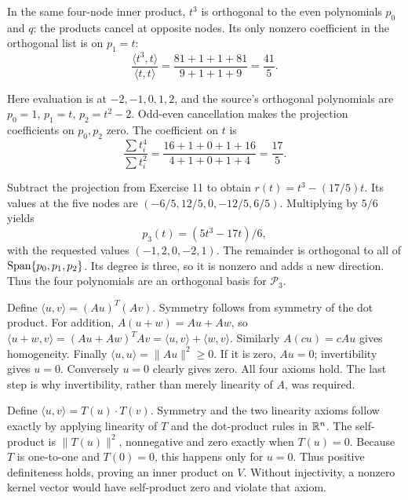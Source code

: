 In the same four-node inner product, $t^3$ is orthogonal to the
even polynomials $p_0$ and $q$: the products cancel at opposite nodes.
Its only nonzero coefficient in the orthogonal list is on $p_1=t$:
\[
 \frac{\langle t^3,t\rangle}{\langle t,t\rangle}
 =\frac{81+1+1+81}{9+1+1+9}=\frac{41}{5}.
\]

Here evaluation is at $-2,-1,0,1,2$, and the source's orthogonal
polynomials are $p_0=1$, $p_1=t$, $p_2=t^2-2$.
Odd-even cancellation makes the projection coefficients on $p_0,p_2$
zero. The coefficient on $t$ is
\[
 \frac{\sum t_i^4}{\sum t_i^2}
 =\frac{16+1+0+1+16}{4+1+0+1+4}=\frac{17}{5}.
\]

Subtract the projection from Exercise 11 to obtain
$r(t)=t^3-(17/5)t$. Its values at the five nodes are
$(-6/5,12/5,0,-12/5,6/5)$.
Multiplying by $5/6$ yields
\[
 \boxed{p_3(t)=(5t^3-17t)/6},
\]
with the requested values $(-1,2,0,-2,1)$. The remainder is
orthogonal to all of $\operatorname{Span}\{p_0,p_1,p_2\}$. Its degree is three,
so it is nonzero and adds a new direction. Thus the four polynomials
are an orthogonal basis for $\mathcal P_3$.

Define $\langle u,v\rangle=(Au)^T(Av)$.
Symmetry follows from symmetry of the dot product. For addition,
$A(u+w)=Au+Aw$, so
$\langle u+w,v\rangle=(Au+Aw)^TAv=\langle u,v\rangle+\langle w,v\rangle$.
Similarly $A(cu)=cAu$ gives homogeneity.
Finally $\langle u,u\rangle=\|Au\|^2\ge0$.
If it is zero, $Au=0$; invertibility gives $u=0$.
Conversely $u=0$ clearly gives zero. All four axioms hold.
The last step is why invertibility, rather than merely linearity of $A$,
was required.

Define $\langle u,v\rangle=T(u)\cdot T(v)$.
Symmetry and the two linearity axioms follow exactly by applying
linearity of $T$ and the dot-product rules in $\mathbb{R}^n$.
The self-product is $\|T(u)\|^2$, nonnegative and zero exactly when
$T(u)=0$. Because $T$ is one-to-one and $T(0)=0$, this happens
only for $u=0$. Thus positive definiteness holds, proving an inner
product on $V$. Without injectivity, a nonzero kernel vector would
have self-product zero and violate that axiom.

